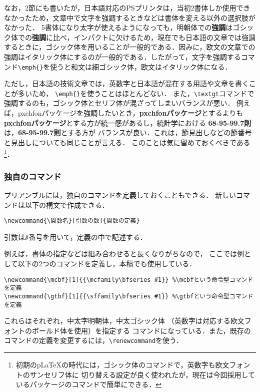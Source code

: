 なお，2節にも書いたが，日本語対応のPSプリンタは，当初2書体しか使用できなかったため，文章中で文字を{\gtfamily 強調}するときなどは書体を変える以外の選択肢がなかった．
5書体になり太字が使えるようになっても，明朝体での{\mcfamily\bfseries 強調}はゴシック体での{\gtfamily\bfseries 強調}に比べ，インパクトに欠けるため，現在でも日本語の文章では強調するときに，ゴシック体を用いることが一般的である．因みに，欧文の文章での強調はイタリック体にするのが一般的である．したがって，文字を強調するコマンド\verb|\emph{}|を使うと和文は細ゴシック体，欧文はイタリック体になる．

ただし，日本語の技術文章では，英数字と日本語が混在する用語や文章を書くことが多いため，
\verb|\emph{}|を使うことはほとんどない．
また，\verb|\textgt|コマンドで強調するのも，ゴシック体とセリフ体が混ざってしまいバランスが悪い．
例えば，pxchfonパッケージを強調したいとき，{\gtfamily\bfseries pxchfonパッケージ}とするよりも{\sffamily\bfseries pxchfonパッケージ}とする方が統一感があるし，統計学における
{\gtfamily\bfseries 68-95-99.7則}は，{\sffamily\bfseries 68-95-99.7則}とする方が
バランスが良い．これは，節見出しなどの節番号と見出しについても同じことが言える．
このことは気に留めておくべきである\footnote{
初期の{p\LaTeX}の時代には，ゴシック体のコマンドで，英数字も欧文フォントのサンセリフ体に
切り替える設定が良く使われたが，現在は今回採用しているパッケージのコマンドで簡単にできる．}．

\subsubsection{独自のコマンド}

プリアンブルには，独自のコマンドを定義しておくこともできる．
新しいコマンドは以下の構文で作成できる．
\begin{tcolorbox}[colback=blue!5!white,colframe=blue!70!black]
\begin{lstlisting}
\newcommand{\関数名}[引数の数]{関数の定義}
\end{lstlisting}
\end{tcolorbox}
\noindent
引数は\verb|#|番号を用いて，定義の中で記述する．

例えば，書体の指定などは組み合わせると長くなりがちなので，
ここでは例として以下の2つのコマンドを定義し，本稿でも使用している．
\begin{tcolorbox}[colback=blue!5!white,colframe=blue!70!black]
\begin{lstlisting}
\newcommand{\mcbf}[1]{{\mcfamily\bfseries #1}} %\mcbfという命令型コマンドを定義
\newcommand{\gtbf}[1]{{\sffamily\bfseries #1}} %\gtbfという命令型コマンドを定義
\end{lstlisting}
\end{tcolorbox}
\noindent
これらはそれぞれ，中太字明朝体，中太ゴシック体
（英数字は対応する欧文フォントのボールド体を使用）を指定する
コマンドになっている．また，既存のコマンドの定義を変更するには，\verb|\renewcommand|を使う．

